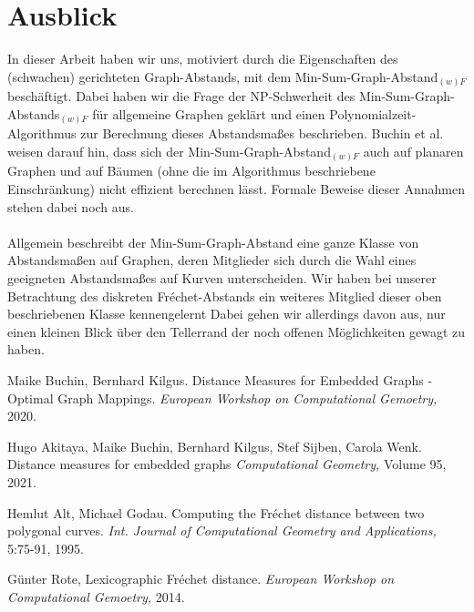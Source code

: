 \documentclass[a4paper, 12pt, twoside]{article}
\theoremstyle{Format1} %
\begin{document}
\section{Ausblick}
In dieser Arbeit haben wir uns, motiviert durch die Eigenschaften des (schwachen) gerichteten Graph-Abstands, mit dem
Min-Sum-Graph-Abstand$_{(w)F}$ beschäftigt. Dabei haben wir die Frage der NP-Schwerheit des Min-Sum-Graph-Abstands$_{(w)F}$ für allgemeine
Graphen geklärt und einen Polynomialzeit-Algorithmus zur Berechnung dieses Abstandsmaßes beschrieben.
Buchin et al. weisen darauf hin, dass sich der Min-Sum-Graph-Abstand$_{(w)F}$ auch auf planaren Graphen und
auf Bäumen (ohne die im Algorithmus beschriebene Einschränkung) nicht effizient berechnen lässt.
Formale Beweise dieser Annahmen stehen dabei noch aus.
\\
\\
Allgemein beschreibt der Min-Sum-Graph-Abstand eine ganze Klasse von Abstandsmaßen auf Graphen, deren Mitglieder sich durch die Wahl
eines geeigneten Abstandsmaßes auf Kurven unterscheiden.
Wir haben bei unserer Betrachtung des diskreten Fréchet-Abstands ein weiteres Mitglied dieser oben beschriebenen Klasse kennengelernt
Dabei gehen wir allerdings davon aus, nur einen kleinen Blick über den Tellerrand der noch offenen Möglichkeiten gewagt zu haben.
\newpage\null\thispagestyle{empty}\newpage

\begin{thebibliography}{4}
		Maike Buchin, Bernhard Kilgus. Distance Measures for Embedded Graphs - Optimal Graph Mappings.
		\textit{European Workshop on Computational Gemoetry,} 2020.

		Hugo Akitaya, Maike Buchin, Bernhard Kilgus, Stef Sijben, Carola Wenk. Distance measures for embedded graphs
		\textit{Computational Geometry,} Volume 95, 2021.

		Hemlut Alt, Michael Godau. Computing the Fréchet distance between two polygonal curves.
		\textit{Int. Journal of Computational Geometry and Applications,} 5:75-91, 1995.

		Günter Rote, Lexicographic Fréchet distance.
		\textit{European Workshop on Computational Gemoetry,} 2014.

\end{thebibliography}


\end{document}

